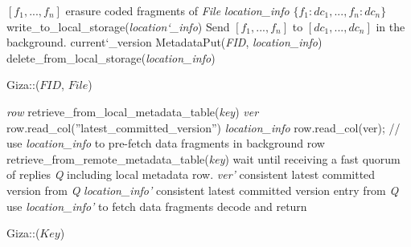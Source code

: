 
\begin{algorithm}
  \DontPrintSemicolon
  $[f_1, ..., f_n]$ \LAR erasure coded fragments of {\em File}\;
  {\em location\_info} \LAR $\{f_1: dc_1, ..., f_n: dc_n\}$\;
  write\_to\_local\_storage({\em location\char`_info})\;
  Send $[f_1, ..., f_n]$ to $[dc_1, ..., dc_n]$ in the background.\;
  current\char`_version \LAR MetadataPut({\em FID}, {\em location\_info})\;
   {
    delete\_from\_local\_storage({\em location\_info})\;
  } 
  \caption{Giza::($FID$, $File$) }
  \label{alg:coordinator}
\end{algorithm}

\begin{algorithm}
  \DontPrintSemicolon
  {\em row} \LAR retrieve\_from\_local\_metadata\_table({\em key}) \;
  {\em ver} \LAR row.read\_col(''latest\_committed\_version'')\;
  {\em location\_info} \LAR row.read\_col(ver); \;
  // use {\em location\_info} to pre-fetch data fragments in background \;
   {
    row \LAR retrieve\_from\_remote\_metadata\_table({\em key})
  }
  wait until receiving a fast quorum of replies {\em Q} including local metadata row. \;
   {
    {\em ver'} \LAR consistent latest committed version from {\em Q}\;
     {
      {\em location\_info'} \LAR consistent latest committed version entry from {\em Q}\;
      use {\em location\_info'} to fetch data fragments\;
      decode and return
    }  
  }
  
  \caption{Giza::($Key$)}
\end{algorithm}

